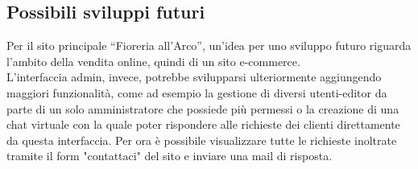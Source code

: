 \subsection{Possibili sviluppi futuri}
Per il sito principale “Fioreria all’Arco”, un’idea per uno sviluppo futuro riguarda l’ambito della vendita online, quindi di un sito e-commerce.\\
L’interfaccia admin, invece, potrebbe svilupparsi ulteriormente aggiungendo maggiori funzionalità, come ad esempio la gestione di diversi utenti-editor da parte di un solo amministratore che possiede più permessi o la creazione di una chat virtuale con la quale poter rispondere alle richieste dei clienti direttamente da questa interfaccia. Per ora è possibile visualizzare tutte le richieste inoltrate tramite il form "contattaci" del sito e inviare una mail di risposta.
